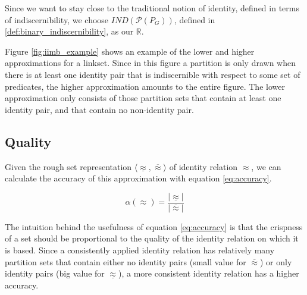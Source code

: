 \documentclass[letterpaper]{article}
\newtheorem{definition}{Definition}
\begin{document}

Since we want to stay close to the traditional notion of identity, defined in terms of indiscernibility, we choose $IND(\mathcal{P}(P_G))$, defined in \ref{def:binary_indiscernibility}, as our $\mathbb{R}$.

Figure \ref{fig:iimb_example} shows an example of the lower and higher approximations for a linkset. Since in this figure a partition is only drawn when there is at least one identity pair that is indiscernible with respect to some set of predicates, the higher approximation amounts to the entire figure. The lower approximation only consists of those partition sets that contain at least one identity pair, and that contain no non-identity pair.

\subsection{Quality}
\label{sec:quality}

Given the rough set representation $\langle \underline{\approx}, \overline{\approx} \rangle$ of identity relation $\approx$, we can calculate the accuracy of this approximation with equation \ref{eq:accuracy}.

\begin{equation}
\label{eq:accuracy}
\alpha(\approx) = \frac{\vert \underline{\approx} \vert}{\vert \overline{\approx} \vert}
\end{equation}

The intuition behind the usefulness of equation \ref{eq:accuracy} is that the crispness of a set should be proportional to the quality of the identity relation on which it is based. Since a consistently applied identity relation has relatively many partition sets that contain either no identity pairs (small value for $\overline{\approx}$) or only identity pairs (big value for $\underline{\approx}$), a more consistent identity relation has a higher accuracy.
\end{document}
